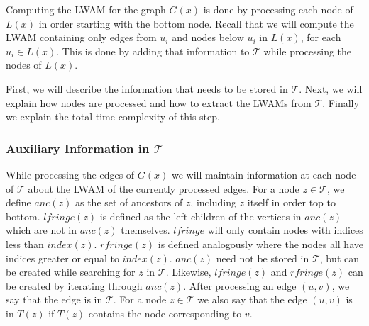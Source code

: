 Computing the LWAM for the graph $G(x)$ is done by processing each node of $L(x)$ in order starting with the bottom node. Recall that we will compute the LWAM containing only edges from $u_i$ and nodes below $u_i$ in $L(x)$, for each $u_i \in L(x)$. This is done by adding that information to $\mathcal{T}$ while processing the nodes of $L(x)$. 

First, we will describe the information that needs to be stored in $\mathcal{T}$. Next, we will explain how nodes are processed and how to extract the LWAMs from $\mathcal{T}$. Finally we explain the total time complexity of this step.

\subsubsection{Auxiliary Information in $\mathcal{T}$}
While processing the edges of $G(x)$ we will maintain information at each node of $\mathcal{T}$ about the LWAM of the currently processed edges. For a node $z \in \mathcal{T}$, we define $anc(z)$ as the set of ancestors of $z$, including $z$ itself in order top to bottom. $lfringe(z)$ is defined as the left children of the vertices in $anc(z)$ which are not in $anc(z)$ themselves. $lfringe$ will only contain nodes with indices less than $index(z)$. $rfringe(z)$ is defined analogously where the nodes all have indices greater or equal to $index(z)$. $anc(z)$ need not be stored in $\mathcal{T}$, but can be created while searching for $z$ in $\mathcal{T}$. Likewise, $lfringe(z)$ and $rfringe(z)$ can be created by iterating through $anc(z)$. After processing an edge $(u,v)$, we say that the edge is in $\mathcal{T}$. For a node $z \in \mathcal{T}$ we also say that the edge $(u,v)$ is in $T(z)$ if $T(z)$ contains the node corresponding to $v$.

